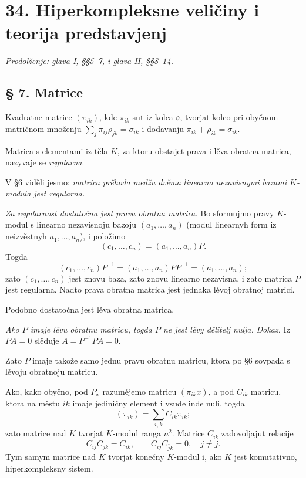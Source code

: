 \documentclass[11pt]{article}
\providecommand{\mo}{\mathfrak{o}}
\begin{document}
\setcounter{footnote}{12}
\section*{34. Hiperkompleksne veličiny i teorija predstavjenj}
\emph{Prodolženje: glava I, §§5--7, i glava II, §§8--14.}

\subsection*{§ 7. Matrice}

Kvadratne matrice $(\pi_{ik})$, kde $\pi_{ik}$ sut iz kolca $\mo$, tvorjat kolco pri obyčnom matričnom množenju $\sum_j \pi_{ij}\rho_{jk}=\sigma_{ik}$ i dodavanju $\pi_{ik}+\rho_{ik}=\sigma_{ik}$.

Matrica s elementami iz těla $K$, za ktoru obstajet prava i lěva obratna matrica, nazyvaje se \emph{regularna}.

V §6 viděli jesmo: \emph{matrica prěhoda medžu dvěma linearno nezavisnymi bazami $K$-modula jest regularna.}

\emph{Za regularnost dostatočna jest prava obratna matrica.} Bo sformujmo pravy $K$-modul s linearno nezavisnoju bazoju $(a_1,\ldots,a_n)$ (modul linearnyh form iz neizvěstnyh $a_1,\ldots,a_n$), i položimo
\[
        (c_1,\ldots,c_n)=(a_1,\ldots,a_n)P.
\]
Togda
\[
        (c_1,\ldots,c_n)P^{-1}=(a_1,\ldots,a_n)PP^{-1}=(a_1,\ldots,a_n);
\]
zato $(c_1,\ldots,c_n)$ jest znovu baza, zato znovu linearno nezavisna, i zato matrica $P$ jest regularna. Nadto prava obratna matrica jest jednaka lěvoj obratnoj matrici.

Podobno dostatočna jest lěva obratna matrica.

\emph{Ako $P$ imaje lěvu obratnu matricu, togda $P$ ne jest lěvy dělitelj nulja.}
\emph{Dokaz.} Iz $PA=0$ slěduje $A=P^{-1}PA=0$.

Zato $P$ imaje takože samo jednu pravu obratnu matricu, ktora po §6 sovpada s lěvoju obratnoju matricu.

Ako, kako obyčno, pod $P_x$ razumějemo matricu $(\pi_{ik}x)$, a pod $C_{ik}$ matricu, ktora na městu $ik$ imaje jediničny element i vsude inde nuli, togda
\[
        (\pi_{ik})=\sum_{i,k} C_{ik}\pi_{ik};
\]
zato matrice nad $K$ tvorjat $K$-modul ranga $n^2$. Matrice $C_{ik}$ zadovoljajut relacije
\[
        C_{ij}C_{jk}=C_{ik},
        \qquad
        C_{ij}C_{\bar j k}=0,\quad j\ne\bar j.
\]
Tym samym matrice nad $K$ tvorjat konečny $K$-modul i, ako $K$ jest komutativno, hiperkompleksny sistem.
\end{document}
